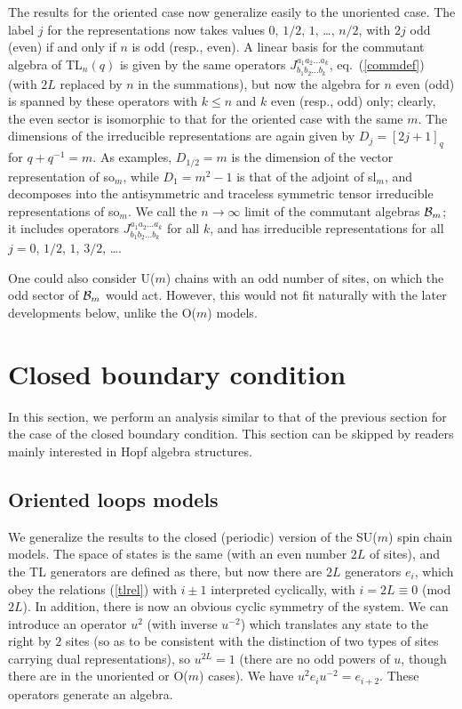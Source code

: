 \documentclass[twocolumn,floats,pra]{revtex4}
\begin{document}
The results for the oriented case now generalize easily to the
unoriented case. The label $j$ for the representations now takes
values $0$, $1/2$, $1$, \ldots, $n/2$, with $2j$ odd (even) if and
only if $n$ is odd (resp., even). A linear basis for the commutant
algebra of TL$_n(q)$ is given by the same operators
$J^{a_1a_2\ldots a_k}_{b_1b_2\ldots b_k}$, eq.\ (\ref{commdef})
(with $2L$ replaced by $n$ in the summations), but now the algebra
for $n$ even (odd) is spanned by these operators with $k\leq n$
and $k$ even (resp., odd) only; clearly, the even sector is
isomorphic to that for the oriented case with the same $m$. The
dimensions of the irreducible representations are again given by
$D_j=[2j+1]_q$ for $q+q^{-1}=m$. As examples, $D_{1/2}=m$ is the
dimension of the vector representation of so$_m$, while
$D_1=m^2-1$ is that of the adjoint of sl$_m$, and decomposes into
the antisymmetric and traceless symmetric tensor irreducible
representations of so$_m$. We call the $n\to\infty$ limit of the
commutant algebras ${\cal B}_m$; it includes operators
$J^{a_1a_2\ldots a_k}_{b_1b_2\ldots b_k}$ for all $k$, and has
irreducible representations for all $j=0$, $1/2$, $1$, $3/2$,
\ldots.

One could also consider U($m$) chains with an odd number of sites,
on which the odd sector of ${\cal B}_m$ would act. However, this
would not fit naturally with the later developments below, unlike
the O($m$) models.



\section{Closed boundary condition}
\label{closch}

In this section, we perform an analysis similar to that of the
previous section for the case of the closed boundary condition.
This section can be skipped by readers mainly interested in Hopf
algebra structures.


\subsection{Oriented loops models}

We generalize the results to the closed (periodic) version of the
SU($m$) spin chain models. The space of states is the same (with
an even number $2L$ of sites), and the TL generators are defined
as there, but now there are $2L$ generators $e_i$, which obey the
relations (\ref{tlrel}) with $i\pm 1$ interpreted cyclically, with
$i=2L\equiv0$ (mod $2L$). In addition, there is now an obvious
cyclic symmetry of the system. We can introduce an operator $u^2$
(with inverse $u^{-2}$) which translates any state to the right by
$2$ sites (so as to be consistent with the distinction of two
types of sites carrying dual representations), so $u^{2L}=1$
(there are no odd powers of $u$, though there are in the
unoriented or O($m$) cases). We have $u^2 e_i u^{-2}=e_{i+2}$.
These operators generate an algebra.
\end{document}
